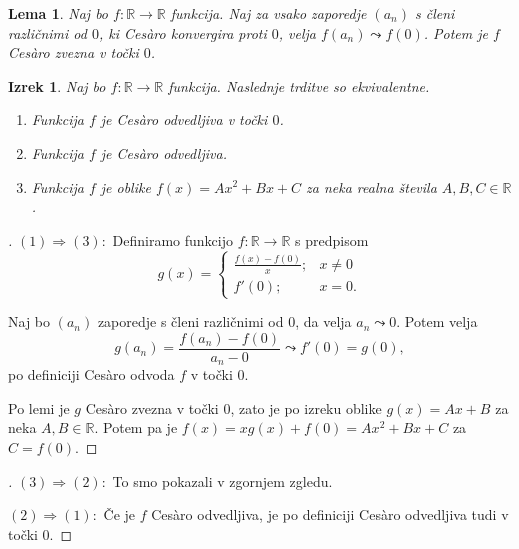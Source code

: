 \documentclass[10]{beamer}
\newtheorem{izrek}{Izrek}
\newtheorem{lema}{Lema}
\newenvironment{dokaz}{\begin{proof}[\bfseries\upshape\proofname]}{\end{proof}}
\begin{document}
\begin{frame}
    \begin{lema}
        \label{lema}
        Naj bo $f: \mathbb{R} \rightarrow \mathbb{R}$ funkcija. Naj za vsako zaporedje $(a_n)$ s členi različnimi od $0$, ki Ces\`{a}ro konvergira proti $0$, velja $f(a_n) \leadsto f(0)$. Potem je $f$ Ces\`{a}ro zvezna v točki $0$.
    \end{lema}
\end{frame}

\begin{frame}
    \begin{izrek}
        \label{klasodv}
        Naj bo $f: \mathbb{R} \rightarrow \mathbb{R}$ funkcija. Naslednje trditve so ekvivalentne.
        \begin{enumerate}
            \item Funkcija $f$ je Ces\`{a}ro odvedljiva v točki $0$.
            \item Funkcija $f$ je Ces\`{a}ro odvedljiva.
            \item Funkcija $f$ je oblike $f(x) = Ax^2 + Bx + C$ za neka realna števila $A, B, C \in \mathbb{R}$.
        \end{enumerate}
    \end{izrek}
\end{frame}

\begin{frame}
    \begin{dokaz}\renewcommand{\qedsymbol}{}
        $(1) \Rightarrow (3): $ Definiramo funkcijo $f: \mathbb{R} \rightarrow \mathbb{R}$ s predpisom 
        $$
        g(x) = \begin{cases}
            \frac{f(x)-f(0)}{x}; & x \neq 0\\
            f'(0); & x = 0.
        \end{cases}
        $$
        \pause

        Naj bo $(a_n)$ zaporedje s členi različnimi od $0$, da velja $a_n \leadsto 0$. Potem velja 
        $$g(a_n) = \frac{f(a_n)-f(0)}{a_n-0} \leadsto f'(0) = g(0),$$
        po definiciji Ces\`{a}ro odvoda $f$ v točki $0$. 
        \pause
        
        Po lemi je $g$ Ces\`{a}ro zvezna v točki $0$, zato je po izreku oblike $g(x) = Ax + B$ za neka $A, B \in \mathbb{R}$. Potem pa je 
        $f(x) = xg(x) + f(0) = Ax^2 + Bx + C$ za $C = f(0)$.
    \end{dokaz}
\end{frame}

\begin{frame}
    \begin{dokaz}
        $(3) \Rightarrow (2): $ To smo pokazali v zgornjem zgledu.
        \pause

        \medskip
        $(2) \Rightarrow (1): $ Če je $f$ Ces\`{a}ro odvedljiva, je po definiciji Ces\`{a}ro odvedljiva tudi v točki $0$.
    \end{dokaz}
\end{frame}
\end{document}
